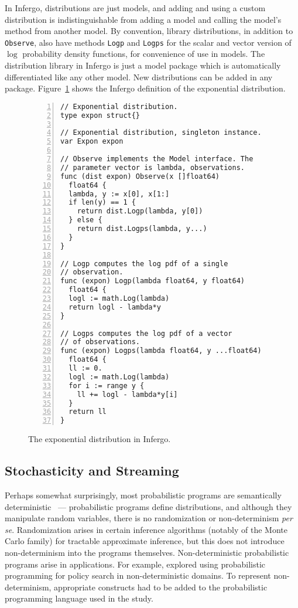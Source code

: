 \documentclass[sigplan,screen]{acmart}
\begin{document}
\begin{sloppypar}
In Infergo, distributions are just models, and adding and using
a custom distribution is indistinguishable from adding a model
and calling the model's method from another model. By
convention, library distributions, in addition to
\lstinline{Observe}, also have methods \lstinline{Logp} and
\lstinline{Logps} for the scalar and vector version of $\log$
probability density functions, for convenience of use in models.
The distribution library in Infergo is just a model package
which is automatically differentiated like any other model.  New
distributions can be added in any package.
Figure~\ref{fig:exponential-distribution} shows the Infergo
definition of the exponential distribution.
\begin{figure}
  \begin{lstlisting}[xleftmargin=11pt,framexleftmargin=10pt,numbers=left]
// Exponential distribution.
type expon struct{}

// Exponential distribution, singleton instance.
var Expon expon

// Observe implements the Model interface. The
// parameter vector is lambda, observations.
func (dist expon) Observe(x []float64)
  float64 {
  lambda, y := x[0], x[1:]
  if len(y) == 1 {
    return dist.Logp(lambda, y[0])
  } else {
    return dist.Logps(lambda, y...)
  }
}

// Logp computes the log pdf of a single
// observation.
func (expon) Logp(lambda float64, y float64)
  float64 {
  logl := math.Log(lambda)
  return logl - lambda*y
}

// Logps computes the log pdf of a vector
// of observations.
func (expon) Logps(lambda float64, y ...float64)
  float64 {
  ll := 0.
  logl := math.Log(lambda)
  for i := range y {
    ll += logl - lambda*y[i]
  }
  return ll
}
  \end{lstlisting}
  \caption{The exponential distribution in Infergo.}
  \label{fig:exponential-distribution}
\end{figure}

\subsection{Stochasticity and Streaming}

Perhaps somewhat surprisingly, most probabilistic programs are
semantically deterministic~\cite{SYW+16} --- probabilistic programs
define distributions, and although they manipulate random
variables, there is no randomization or non-determinism
\textit{per se}. Randomization arises in certain inference
algorithms (notably of the Monte Carlo family) for tractable
approximate inference, but this does not introduce
non-determinism into the programs themselves. Non-deterministic
probabilistic programs arise in applications. For example,
\citet{MPT+16} explored using probabilistic programming for
policy search in non-deterministic domains. To represent
non-determinism, appropriate constructs had to be added to the
probabilistic programming language used in the study.


\end{sloppypar}
\end{document}
